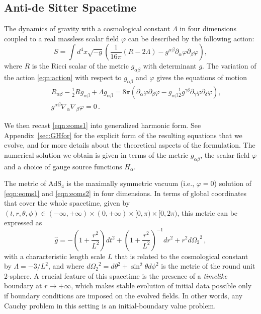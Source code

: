 \documentclass[a4paper,11pt]{article}
\numberwithin{equation}{section}
\begin{document}
\subsection{Anti-de Sitter Spacetime}\label{subsec:AdS}
The dynamics of gravity with a cosmological constant $\Lambda$ in four dimensions coupled to a real massless scalar field $\varphi$ can be described by the following action:
\begin{equation}\label{eqn:action}
S = \int d^4 x \sqrt{-g} \left( \frac{1}{16\pi} \left( R - 2\Lambda \right) - g^{\alpha\beta} \partial_\alpha \varphi \partial_\beta \varphi \right),
\end{equation}
where $R$ is the Ricci scalar of the metric $g_{\alpha\beta}$ with determinant $g$.
The variation of the action \eqref{eqn:action} with respect to $g_{\alpha\beta}$ and $\varphi$ gives the equations of motion
\begin{eqnarray}
\label{eqn:eoms1}
&&R_{\alpha\beta} - \frac{1}{2} R g_{\alpha\beta} + \Lambda g_{\alpha\beta} = 8\pi \left( \partial_\alpha \varphi \partial_\beta \varphi - g_{\alpha\beta} \frac{1}{2} g^{\gamma\delta} \partial_{\gamma} \varphi \partial_{\delta} \varphi \right),\\
\label{eqn:eoms2}
&&g^{\alpha\beta} \nabla_{\alpha} \nabla_{\beta} \varphi = 0\,.
\end{eqnarray}

We then recast \eqref{eqn:eoms1} into generalized harmonic form.
See Appendix~\ref{sec:GHfor} for the explicit form of the resulting equations that we evolve, and \cite{Pretorius:2004jg} for more details about the theoretical aspects of the formulation.
The numerical solution we obtain is given 
in terms of the metric $g_{\alpha\beta}$, the scalar field $\varphi$ and a choice of gauge source functions $H_\alpha$. 

The metric of AdS$_4$ is the maximally symmetric vacuum (i.e., $\varphi=0$) solution of \eqref{eqn:eoms1} and \eqref{eqn:eoms2} in four dimensions.
In terms of global coordinates that cover the whole spacetime, given by $(t,r,\theta,\phi)\in(-\infty,+\infty)\times(0,+\infty)\times[0,\pi)\times[0,2\pi)$, this metric can be expressed as
\begin{equation}\label{eqn:ads4}
\hat{g}= -\left(1+\frac{r^2}{L^2}\right) dt^2 + \left(1+\frac{r^2}{L^2}\right)^{-1} dr^2 +r^2 d{\Omega_2}^2 \,,
\end{equation}
with a characteristic length scale $L$ that is related to the cosmological constant by $\Lambda = - 3/L^2$, and where $d{\Omega_2}^2 = d\theta^2 + \sin^2\theta d\phi^2$ is the metric of the round unit 2-sphere. 
A crucial feature of this spacetime is the presence of a \emph{timelike} boundary at $r \rightarrow +\infty$, which makes stable evolution of initial data possible only if boundary conditions are imposed on the evolved fields. 
In other words, any Cauchy problem in this setting is an initial-boundary value problem.
\end{document}
